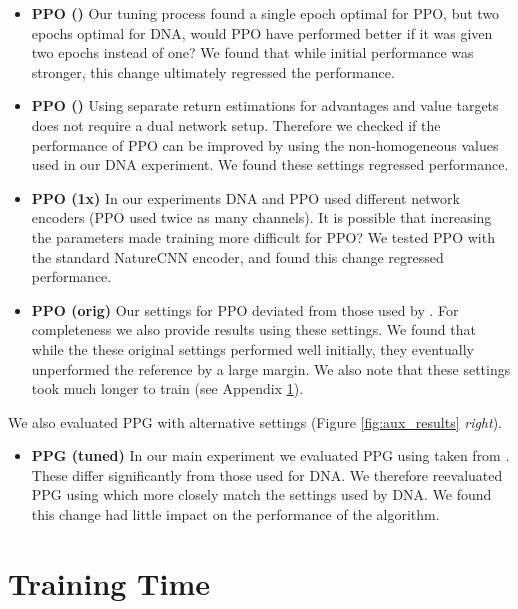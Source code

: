 \documentclass{article}
\begin{document}
\begin{itemize}

\item \textbf{PPO ()}
Our tuning process found a single epoch optimal for PPO, but two epochs optimal for DNA, would PPO have performed better if it was given two epochs instead of one? We found that while initial performance was stronger, this change ultimately regressed the performance.

\item \textbf{PPO ()} 
Using separate return estimations for advantages and value targets does not require a dual network setup. Therefore we checked if the performance of PPO can be improved by using the non-homogeneous  values used in our DNA experiment. We found these settings regressed performance.

\item \textbf{PPO (1x)}
In our experiments DNA and PPO used different network encoders (PPO used twice as many channels). It is possible that increasing the parameters made training more difficult for PPO? We tested PPO with the standard NatureCNN encoder, and found this change regressed performance.
     
\item \textbf{PPO (orig)}
Our settings for PPO deviated from those used by \cite{schulman2017proximal}. For completeness we also provide results using these settings. We found that while the these original settings performed well initially, they eventually unperformed the reference by a large margin. We also note that these settings took much longer to train (see Appendix \ref{app:time}).

\end{itemize}

We also evaluated PPG with alternative settings (Figure \ref{fig:aux_results} \textit{right}).

\begin{itemize}
\item \textbf{PPG (tuned)} In our main experiment we evaluated PPG using  taken from \cite{cobbe2021phasic}. These differ significantly from those used for DNA. We therefore reevaluated PPG using  which more closely match the settings used by DNA. We found this change had little impact on the performance of the algorithm.
\end{itemize}



\section{Training Time}
\label{app:time}
\end{document}

